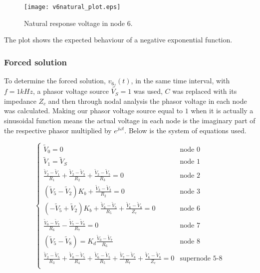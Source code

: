 

\begin{figure}[H] \centering
\texttt{[image: v6natural\_plot.eps]}
\caption{Natural response voltage in node 6.}
\label{fig:natural}
\end{figure}

The plot shows the expected behaviour of a negative exponential function.


\subsubsection{Forced solution}  %
\label{subsubsec:theor_forced}
To determine the forced solution, $v_{6_{f}}(t)$, in the same time interval, with $f=1kHz$, a phasor voltage source $\tilde{V_S}=1$ was used, $C$ was replaced with its impedance $Z_c$ and then through nodal analysis the phasor voltage in each node was calculated. Making our phasor voltage source equal to $1$ when it is actually a sinusoidal function means the actual voltage in each node is the imaginary part of the respective phasor multiplied by $e^{j \omega t}$. Below is the system of equations used.


\begin{equation}
  \begin{cases}
  \tilde{V}_0 = 0 & \mbox{node 0} \\
   \tilde{V}_1 = \tilde{V}_S & \mbox{node 1} \\
  \frac{\tilde{V}_2-\tilde{V}_1}{R_1}+\frac{\tilde{V}_2-\tilde{V}_3}{R_2}+\frac{\tilde{V}_2-\tilde{V}_5}{R_3} = 0 & \mbox{node 2} \\
  (\tilde{V}_5-\tilde{V}_2)K_b + \frac{\tilde{V}_3-\tilde{V}_2}{R_2} = 0 & \mbox{node 3} \\
  (-\tilde{V}_5+\tilde{V}_2)K_b + \frac{\tilde{V}_6-\tilde{V}_5}{R_5} + \frac{\tilde{V}_6-\tilde{V}_8}{Z_c} = 0 & \mbox{node 6} \\
  \frac{\tilde{V}_0-\tilde{V}_7}{R_6} - \frac{\tilde{V}_7-\tilde{V}_8}{R_7} = 0 & \mbox{node 7} \\
  (\tilde{V}_5-\tilde{V}_8) = K_d \frac{\tilde{V}_0-\tilde{V}_7}{R_6} & \mbox{node 8} \\
  \frac{\tilde{V}_2-\tilde{V}_5}{R_3} + \frac{\tilde{V}_0-\tilde{V}_5}{R_4} + \frac{\tilde{V}_6-\tilde{V}_5}{R_5} + \frac{\tilde{V}_7-\tilde{V}_8}{R_7} + \frac{\tilde{V}_6-\tilde{V}_8}{Z_c} = 0 & \mbox{supernode 5-8} \\ 
  \end{cases}
\end{equation}

